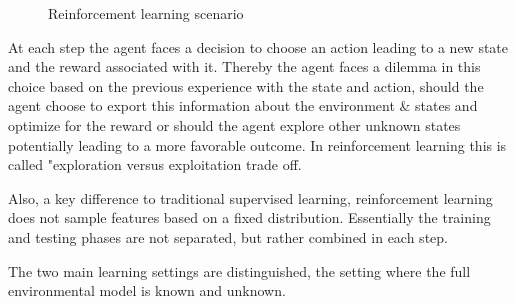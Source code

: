 \begin{figure}[ht!]
    \centering
    \caption{Reinforcement learning scenario \label{fig: 1}}
\end{figure}

At each step the agent faces a decision to choose an action leading to a new
state and the reward associated with it. Thereby the agent faces a dilemma in
this choice based on the previous experience with the state and action,
should the agent choose to export this information about the environment \&
states and optimize for the reward or should the agent explore other unknown
states potentially leading to a more favorable outcome. In reinforcement
learning this is called "exploration versus exploitation trade off.

Also, a key difference to traditional supervised learning, reinforcement
learning does not sample features based on a fixed distribution. Essentially
the training and testing phases are not separated, but rather combined in
each step.
\newline

The two main learning settings are distinguished, the setting where the
full environmental model is known and unknown.


